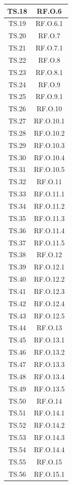 \begin{xltabular}{\textwidth}{|c|c|}
\hline
TS.18 & RF.O.6 \\
\hline
TS.19 & RF.O.6.1 \\
\hline
TS.20 & RF.O.7 \\
\hline
TS.21 & RF.O.7.1 \\
\hline
TS.22 & RF.O.8 \\
\hline
TS.23 & RF.O.8.1 \\
\hline
TS.24 & RF.O.9 \\
\hline
TS.25 & RF.O.9.1 \\
\hline
TS.26 & RF.O.10 \\
\hline
TS.27 & RF.O.10.1 \\
\hline
TS.28 & RF.O.10.2 \\
\hline
TS.29 & RF.O.10.3 \\
\hline
TS.30 & RF.O.10.4 \\
\hline
TS.31 & RF.O.10.5 \\
\hline
TS.32 & RF.O.11 \\
\hline
TS.33 & RF.O.11.1 \\
\hline
TS.34 & RF.O.11.2 \\
\hline
TS.35 & RF.O.11.3 \\
\hline
TS.36 & RF.O.11.4 \\
\hline
TS.37 & RF.O.11.5 \\
\hline
TS.38 & RF.O.12 \\
\hline
TS.39 & RF.O.12.1 \\
\hline
TS.40 & RF.O.12.2 \\
\hline
TS.41 & RF.O.12.3 \\
\hline
TS.42 & RF.O.12.4 \\
\hline
TS.43 & RF.O.12.5 \\
\hline
TS.44 & RF.O.13 \\
\hline
TS.45 & RF.O.13.1 \\
\hline
TS.46 & RF.O.13.2 \\
\hline
TS.47 & RF.O.13.3 \\
\hline
TS.48 & RF.O.13.4 \\
\hline
TS.49 & RF.O.13.5 \\
\hline
TS.50 & RF.O.14 \\
\hline
TS.51 & RF.O.14.1 \\
\hline
TS.52 & RF.O.14.2 \\
\hline
TS.53 & RF.O.14.3 \\
\hline
TS.54 & RF.O.14.4 \\
\hline
TS.55 & RF.O.15 \\
\hline
TS.56 & RF.O.15.1 \\

\end{xltabular}
